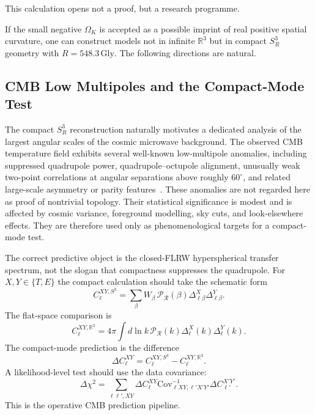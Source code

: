 \documentclass[aps,prd,onecolumn,superscriptaddress,longbibliography,nofootinbib,notitlepage]{revtex4-2}
\newcommand{\Gly}{\,\mathrm{Gly}}
\begin{document}
This calculation opens not a proof, but a research programme.

If the small negative $\Omega_K$ is accepted as a possible imprint of real positive
spatial curvature, one can construct models not in infinite $\mathbb{R}^3$ but in
compact $S^3_R$ geometry with $R = 548.3\Gly$. The following
directions are natural.


\subsection{CMB Low Multipoles and the Compact-Mode Test}
\label{sec:cmb-low-l}
The compact $S^3_R$ reconstruction naturally motivates a dedicated analysis of
the largest angular scales of the cosmic microwave background. The observed CMB
temperature field exhibits several well-known low-multipole anomalies, including
suppressed quadrupole power, quadrupole--octupole alignment, unusually weak
two-point correlations at angular separations above roughly $60^\circ$, and
related large-scale asymmetry or parity features~\cite{Copi2010,PlanckIsotropy2019}.
These anomalies are not regarded here as proof of nontrivial topology. Their
statistical significance is modest and is affected by cosmic variance, foreground
modelling, sky cuts, and look-elsewhere effects. They are therefore used only as
phenomenological targets for a compact-mode test.

The correct predictive object is the closed-FLRW hyperspherical transfer
spectrum, not the slogan that compactness suppresses the quadrupole. For
$X,Y\in\{T,E\}$ the compact calculation should take the schematic form
\begin{equation}
\boxed{
  C_\ell^{XY,S^3}
  =\sum_\beta W_\beta\,
  \mathcal P_{\mathcal R}(\beta)
  \Delta_{\ell\beta}^{X}\Delta_{\ell\beta}^{Y}.}
\end{equation}
The flat-space comparison is
\begin{equation}
  C_\ell^{XY,\mathbb R^3}
  =4\pi\int d\ln k\,
  \mathcal P_{\mathcal R}(k)
  \Delta_\ell^X(k)\Delta_\ell^Y(k).
\end{equation}
The compact-mode prediction is the difference
\begin{equation}
  \Delta C_\ell^{XY}=C_\ell^{XY,S^3}-C_\ell^{XY,\mathbb R^3}.
\end{equation}
A likelihood-level test should use the data covariance:
\begin{equation}
  \Delta\chi^2
  =\sum_{\ell\ell',XY}
  \Delta C_\ell^{XY}
  \mathrm{Cov}^{-1}_{\ell XY,\ell'X'Y'}
  \Delta C_{\ell'}^{X'Y'} .
\end{equation}
This is the operative CMB prediction pipeline.
\end{document}
